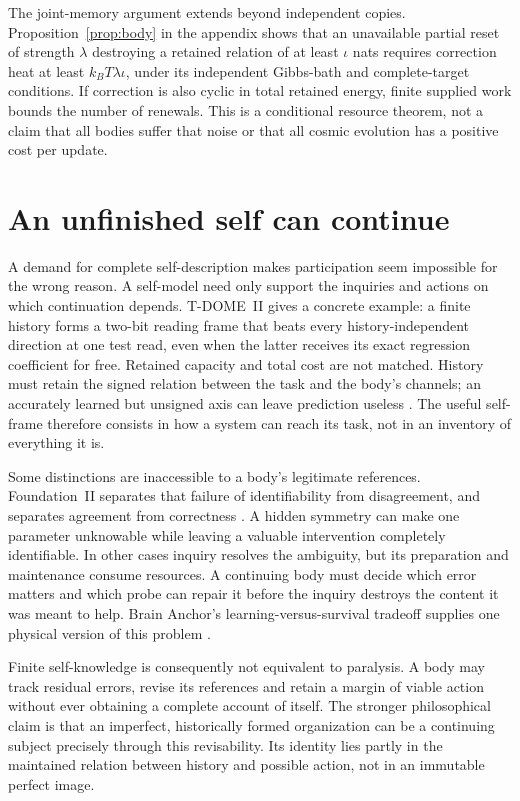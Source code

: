 \documentclass[12pt,a4paper]{article}
\begin{document}
The joint-memory argument extends beyond independent copies.
Proposition~\ref{prop:body} in the appendix shows that an unavailable
partial reset of strength $\lambda$ destroying a retained relation of
at least $\iota$ nats requires correction heat at least
$k_BT\lambda\iota$, under its independent Gibbs-bath and complete-target
conditions. If correction is also cyclic in total retained energy,
finite supplied work bounds the number of renewals. This is a
conditional resource theorem, not a claim that all bodies suffer that
noise or that all cosmic evolution has a positive cost per update.

\section{An unfinished self can continue}

A demand for complete self-description makes participation seem impossible for the wrong reason. A self-model need only support the inquiries and actions on which continuation depends. T-DOME~II gives a concrete example: a finite history forms a two-bit reading frame that beats every history-independent direction at one test read, even when the latter receives its exact regression coefficient for free. Retained capacity and total cost are not matched. History must retain the signed relation between the task and the body's channels; an accurately learned but unsigned axis can leave prediction useless \cite{TD}. The useful self-frame therefore consists in how a system can reach its task, not in an inventory of everything it is.

Some distinctions are inaccessible to a body's legitimate references. Foundation~II separates that failure of identifiability from disagreement, and separates agreement from correctness \cite{Foundation}. A hidden symmetry can make one parameter unknowable while leaving a valuable intervention completely identifiable. In other cases inquiry resolves the ambiguity, but its preparation and maintenance consume resources. A continuing body must decide which error matters and which probe can repair it before the inquiry destroys the content it was meant to help. Brain Anchor's learning-versus-survival tradeoff supplies one physical version of this problem \cite{Brain}.

Finite self-knowledge is consequently not equivalent to paralysis. A body may track residual errors, revise its references and retain a margin of viable action without ever obtaining a complete account of itself. The stronger philosophical claim is that an imperfect, historically formed organization can be a continuing subject precisely through this revisability. Its identity lies partly in the maintained relation between history and possible action, not in an immutable perfect image.
\end{document}
